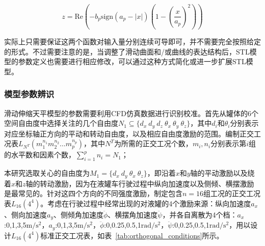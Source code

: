             \begin{equation}
            z = \mathrm{Re}\left( -b_p \mathrm{sign}(a_p - |x|) \left( 1 - \left( \frac{x}{a_p} \right)^2 \right) \right)
            \end{equation}

            实际上只需要保证这两个函数对输入量分别连续可导即可，并不需要完全按照给定的形式。不过需要注意的是，当调整了滑动曲面和/或曲线的表达结构后，STL模型的参数定义也需要进行相应修改，可以通过这种方式简化或进一步扩展STL模型。

        \subsubsection{模型参数辨识}
            \label{subsub:model_identification}
            滑动伸缩天平模型的参数需要利用CFD仿真数据进行识别校准。首先从罐体的6个空间自由度中选择关注的几个自由度$N_1 \subseteq \{d_x\ d_y\ d_z\ \theta_x\ \theta_y\ \theta_z\}$，其中$d_i$和$\theta_i$分别表示对应坐标轴正方向的平动和转动自由度，以及相应自由度激励的范围。编制正交工况表$L_{N^T}(m_1^{n_1}m_2^{n_2}\dots m_p^{n_p})$，其中$N^T$为所需的正交工况个数，$m_i,n_i$分别表示第$i$组的水平数和因素个数，$\sum_{i=1}^p n_i = N_1$；

            本研究选取关心的自由度为$M_1 = \{d_x\ d_y\ \theta_x\ \theta_z\}$，即沿着$x$和$y$轴的平动激励以及绕着$x$和$z$轴的转动激励，因为在液罐车行驶过程中纵向加速度以及侧倾、横摆激励是最常见的。针对这四个方向的不同强度激励，制定包含$n=16$组工况的正交工况表$L_{16}(4^4)$。考虑在行驶过程中经常出现的对液罐的4个激励来源：纵向加速度$a_x$、侧向加速度$a_y$、侧倾角加速度$\ddot{\phi}$、横摆角加速度$\ddot{\psi}$，并各自离散为4个档：$a_x$:0,1,3,5$\mathrm{m/s^2}$，$a_y$:0,1,3,5$\mathrm{m/s^2}$，$\ddot{\phi}$:0,0.25,0.5,1$\mathrm{rad/s^2}$，$\ddot{\psi}$:0,0.25,0.5,1$\mathrm{rad/s^2}$，用以设计$L_{16}(4^4)$标准正交工况表，如表~\ref{tab:orthogonal_conditions}所示。

